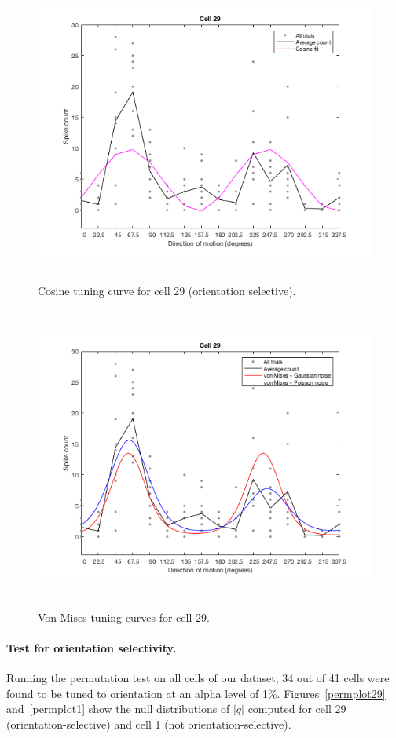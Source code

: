 \documentclass[10pt]{article}
\begin{document}
\begin{figure}[!h]
\centering
\includegraphics[height=10cm]{fitCos.png}
\caption{Cosine tuning curve for cell 29 (orientation selective).
\label{fitCos29}}
\end{figure}

\begin{figure}[!h]
\centering
\includegraphics[height=10cm]{fitVonMises.png}
\caption{Von Mises tuning curves for cell 29.
\label{fitVonMises}}
\end{figure}

\paragraph{Test for orientation selectivity.} Running the permutation test on all cells of our dataset, 34 out of 41 cells were found to be tuned to orientation at an alpha level of 1\%. Figures~\ref{permplot29} and~\ref{permplot1} show the null distributions of $|q|$ computed for cell 29 (orientation-selective) and cell 1 (not orientation-selective).
\end{document}
